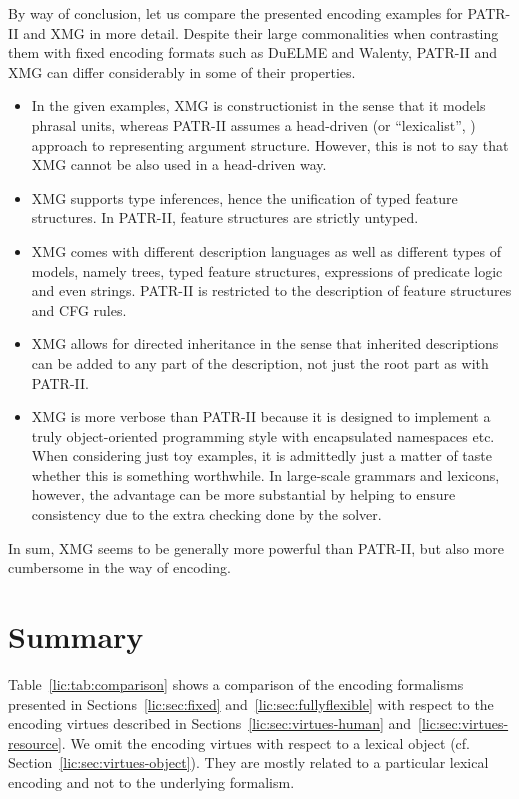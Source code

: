 \documentclass[output=paper]{langsci/langscibook}
\begin{document}
By way of conclusion, let us compare the presented encoding examples for PA\-TR-II and XMG in more detail. Despite their large  commonalities when contrasting them with fixed encoding formats such as DuELME and Walenty, PATR-II and XMG can differ considerably in some of their properties.
\begin{itemize}
\item In the given examples, XMG is constructionist in the sense that it models phrasal units, whereas PATR-II assumes a head-driven (or ``lexicalist'', \citealt{mueller:wechsler:14}) approach to representing argument structure. However, this is not to say that XMG cannot be also used in a head-driven way. 
\item XMG supports type inferences, hence the unification of typed feature structures. In PATR-II, feature structures are strictly untyped.
\item XMG comes with different description languages as well as different types of models, namely trees, typed feature structures, expressions of predicate logic and even strings. PATR-II is restricted to the description of feature structures and CFG rules.   
\item XMG allows for directed inheritance in the sense that inherited descriptions can be added to any part of the description, not just the root part as with PATR-II.
\item XMG is more verbose than PATR-II because it is designed to implement a truly object-oriented programming style with encapsulated namespaces etc. When considering just toy examples, it is admittedly just a matter of taste whether this is something worthwhile. In large-scale grammars and lexicons, however, the advantage can be more substantial by helping to ensure consistency due to the extra checking done by the solver.
\end{itemize}
In sum, XMG seems to be generally more powerful than PATR-II, but also more cumbersome in the way of encoding. 


\section{Summary}
%
\label{lic:sec:summary}

Table~\ref{lic:tab:comparison} shows a comparison of the encoding formalisms presented in Sections~\ref{lic:sec:fixed} and~\ref{lic:sec:fullyflexible} with respect to the encoding virtues described in Sections~\ref{lic:sec:virtues-human} and~\ref{lic:sec:virtues-resource}. We omit the encoding virtues with respect to a lexical object (cf. Section~\ref{lic:sec:virtues-object}). They are mostly related to a particular lexical encoding and not to the underlying formalism.
\end{document}
